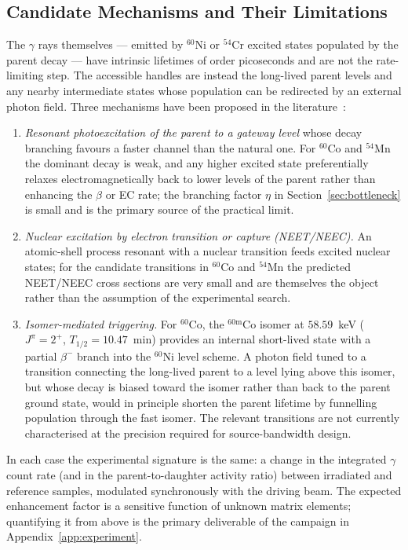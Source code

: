 \documentclass[conference]{IEEEtran}
\begin{document}
\subsection{Candidate Mechanisms and Their Limitations}
The $\gamma$ rays themselves --- emitted by $^{60}$Ni or $^{54}$Cr excited states populated by the parent decay --- have intrinsic lifetimes of order picoseconds and are not the rate-limiting step. The accessible handles are instead the long-lived parent levels and any nearby intermediate states whose population can be redirected by an external photon field. Three mechanisms have been proposed in the literature~\cite{karpeshin2006induced,palffy2007neec,walker2020isomers}:
\begin{enumerate}
\item \emph{Resonant photoexcitation of the parent to a gateway level} whose decay branching favours a faster channel than the natural one. For $^{60}$Co and $^{54}$Mn the dominant decay is weak, and any higher excited state preferentially relaxes electromagnetically back to lower levels of the parent rather than enhancing the $\beta$ or EC rate; the branching factor $\eta$ in Section~\ref{sec:bottleneck} is small and is the primary source of the practical limit.
\item \emph{Nuclear excitation by electron transition or capture (NEET/NEEC).} An atomic-shell process resonant with a nuclear transition feeds excited nuclear states; for the candidate transitions in $^{60}$Co and $^{54}$Mn the predicted NEET/NEEC cross sections are very small and are themselves the object rather than the assumption of the experimental search.
\item \emph{Isomer-mediated triggering.} For $^{60}$Co, the $^{60\mathrm{m}}$Co isomer at $58.59$~keV ($J^\pi=2^+$, $T_{1/2}=10.47$~min) provides an internal short-lived state with a partial $\beta^-$ branch into the $^{60}$Ni level scheme. A photon field tuned to a transition connecting the long-lived parent to a level lying above this isomer, but whose decay is biased toward the isomer rather than back to the parent ground state, would in principle shorten the parent lifetime by funnelling population through the fast isomer. The relevant transitions are not currently characterised at the precision required for source-bandwidth design.
\end{enumerate}
In each case the experimental signature is the same: a change in the integrated $\gamma$ count rate (and in the parent-to-daughter activity ratio) between irradiated and reference samples, modulated synchronously with the driving beam. The expected enhancement factor is a sensitive function of unknown matrix elements; quantifying it from above is the primary deliverable of the campaign in Appendix~\ref{app:experiment}.
\end{document}
